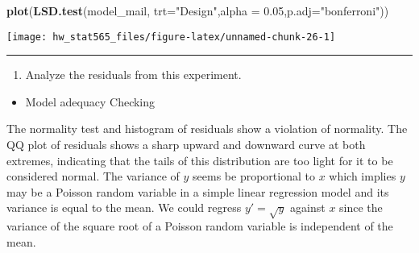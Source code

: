 \documentclass[]{article}
\newenvironment{Shaded}{\begin{snugshade}}{\end{snugshade}}
\newcommand{\CommentTok}[1]{\textcolor[rgb]{0.56,0.35,0.01}{\textit{#1}}}
\newcommand{\DataTypeTok}[1]{\textcolor[rgb]{0.13,0.29,0.53}{#1}}
\newcommand{\FloatTok}[1]{\textcolor[rgb]{0.00,0.00,0.81}{#1}}
\newcommand{\KeywordTok}[1]{\textcolor[rgb]{0.13,0.29,0.53}{\textbf{#1}}}
\newcommand{\NormalTok}[1]{#1}
\newcommand{\OperatorTok}[1]{\textcolor[rgb]{0.81,0.36,0.00}{\textbf{#1}}}
\newcommand{\OtherTok}[1]{\textcolor[rgb]{0.56,0.35,0.01}{#1}}
\newcommand{\StringTok}[1]{\textcolor[rgb]{0.31,0.60,0.02}{#1}}
\providecommand{\tightlist}{%
  \setlength{\itemsep}{0pt}\setlength{\parskip}{0pt}}
\begin{document}
\begin{Shaded}
\begin{Highlighting}[]
\KeywordTok{plot}\NormalTok{(}\KeywordTok{LSD.test}\NormalTok{(model_mail, }\DataTypeTok{trt=}\StringTok{"Design"}\NormalTok{,}\DataTypeTok{alpha =} \FloatTok{0.05}\NormalTok{,}\DataTypeTok{p.adj=}\StringTok{"bonferroni"}\NormalTok{))}
\end{Highlighting}
\end{Shaded}

\texttt{[image: hw\_stat565\_files/figure-latex/unnamed-chunk-26-1]}

\begin{Shaded}
\end{Shaded}

\begin{center}\rule{0.5\linewidth}{\linethickness}\end{center}

\begin{enumerate}
\def\labelenumi{(\alph{enumi})}
\setcounter{enumi}{2}
\tightlist
\item
  Analyze the residuals from this experiment.
\end{enumerate}

\begin{itemize}
\tightlist
\item
  Model adequacy Checking
\end{itemize}

The normality test and histogram of residuals show a violation of
normality. The QQ plot of residuals shows a sharp upward and downward
curve at both extremes, indicating that the tails of this distribution
are too light for it to be considered normal. The variance of \(y\)
seems be proportional to \(x\) which implies \(y\) may be a Poisson
random variable in a simple linear regression model and its variance is
equal to the mean. We could regress \(y′=\sqrt y\) against \(x\) since
the variance of the square root of a Poisson random variable is
independent of the mean.
\end{document}
